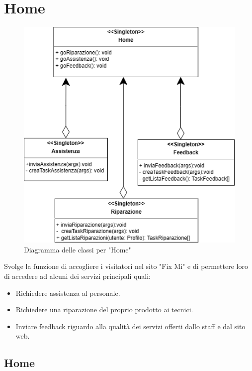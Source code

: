 \documentclass{report}
\begin{document}
\section{Home}
\begin{figure}[H]
	\centering\includegraphics[width=1\textwidth]{images/Diagramma_delle_classi_home.png}
	Diagramma delle classi per "Home"
\end{figure}
Svolge la funzione di accogliere i visitatori nel sito "Fix Mi" e di permettere loro di accedere ad alcuni dei servizi principali quali:
\begin{itemize}
	\item Richiedere assistenza al personale.
	\item Richiedere una riparazione del proprio prodotto ai tecnici.
	\item Inviare feedback riguardo alla qualità dei servizi offerti dallo staff e dal sito web.
\end{itemize}
\subsection*{Home}
\end{document}
